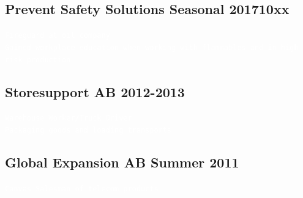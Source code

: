 \documentclass[12pt, letterpaper]{article}
\begin{document}
    \subsection{Prevent Safety Solutions Seasonal 201710xx}\label{subsec:job4}
      \texttt{\textcolor{white}{Fireguard at oil company \\
      Gained workplace education when working with flammables and in high risk production
      }}
    \subsection{Storesupport AB 2012-2013}\label{subsec:job5}
      \texttt{\textcolor{white}{Warehouse Worker/Truck Driver \\
      Packaging goods and loading transports
      }}
    \subsection{Global Expansion AB Summer 2011}\label{subsec:job6}
      \texttt{\textcolor{white}{Canvas Salesman of telecom products
      }}
\end{document}
